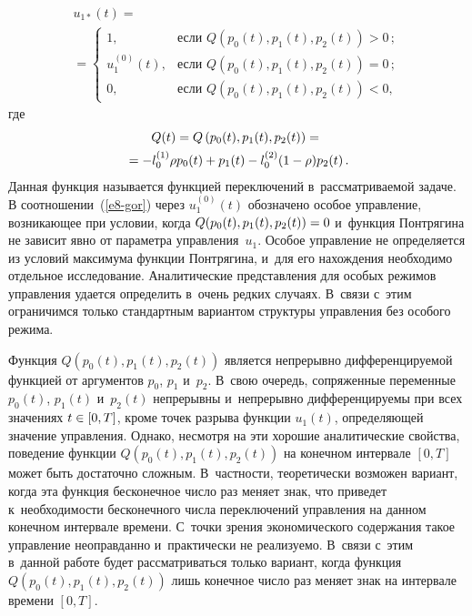 \begin{multicols}{2}
\noindent
\begin{multline}
u_{1*}(t)={}\\
{}=\begin{cases}
1, &\mbox{если } Q(p_0(t),p_1(t),p_2(t))>0\,;
\\
u^{(0)}_1(t),  &\mbox{если } Q(p_0(t),p_1(t),p_2(t))=0\,;
\\
0, &\mbox{если } Q(p_0(t),p_1(t),p_2(t))<0,
\end{cases}
\label{e8-gor}
\end{multline}
где 
\begin{multline*}
Q(t)=Q\left(p_0(t),p_1(t),p_2(t)\right)={}\\
{}=-l^{(1)}_0 \rho p_0(t) \hm+ p_1(t) 
\hm- l^{(2)}_0 ( 1 \hm-\rho) p_2(t)\,.
\end{multline*}
Данная функция называется функцией переключений в~рассматриваемой задаче.
В соотношении~(\ref{e8-gor}) через $u^{(0)}_1 (t)$ обозначено особое управ\-ле\-ние, 
возникающее при условии, когда $Q(p_0(t),p_1(t),p_2(t))\hm=0$ и~функция Понтрягина 
не зависит явно от па\-ра\-мет\-ра управ\-ле\-ния~$u_1$. Особое управ\-ле\-ние не определяется 
из условий максимума функции Понтрягина, и~для его нахождения необходимо отдельное 
исследование. Аналитические представления для особых режимов управ\-ле\-ния удается 
определить в~очень редких случаях. В~связи с~этим  ограничимся только стандартным 
вариантом структуры управ\-ле\-ния без особого режима.

Функция $Q(p_0(t),p_1(t),p_2(t))$ является непрерывно дифференцируемой 
функцией от аргументов $p_0$, $p_1$ и~$p_2$. В~свою очередь, сопряженные переменные 
$p_0(t)$, $p_1(t)$ и~$p_2(t)$ непрерывны  и~непрерывно дифференцируемы при всех 
значениях $t \hm\in [0,T]$, кроме точек разрыва функции $u_1(t)$, определяющей значение 
управления. Однако, не\-смот\-ря на эти хорошие аналитические свойства, поведение 
функции $Q(p_0(t),p_1(t),p_2(t))$ на конечном интервале  $[0,T]$ может быть 
достаточно сложным. В~част\-ности, теоретически возможен вариант, когда эта функция 
бесконечное чис\-ло раз меняет знак, что приведет к~необходимости бесконечного чис\-ла 
переключений управления на данном конечном интервале времени. С~точки зрения 
экономического содержания такое управ\-ле\-ние неоправданно и~практически не реализуемо. 
В~связи с~этим в~данной работе будет рас\-смат\-ри\-вать\-ся только вариант, когда функция  
$Q(p_0(t),p_1(t),p_2(t))$ лишь конечное чис\-ло раз меняет знак на интервале времени 
$[0,T]$.


\end{multicols}
